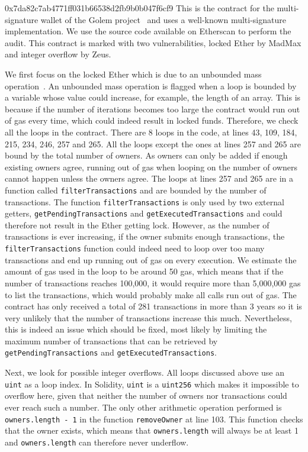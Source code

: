 \begin{investigation}{0x7da82c7ab4771ff031b66538d2fb9b0b047f6cf9}
  This is the contract for the multi-signature wallet of the Golem project~\cite{golem-project} and uses a well-known multi-signature implementation. We use the source code available on Etherscan to perform the audit.
  This contract is marked with two vulnerabilities, locked Ether by MadMax and integer overflow by Zeus.

  We first focus on the locked Ether which is due to an unbounded mass operation~\cite{Grech2018}.
  An unbounded mass operation is flagged when a loop is bounded by a variable whose value could increase, for example, the length of an array. This is because if the number of iterations becomes too large the contract would run out of gas every time, which could indeed result in locked funds. Therefore, we check all the loops in the contract. There are 8 loops in the code, at lines 43, 109, 184, 215, 234, 246, 257 and 265. All the loops except the ones at lines 257 and 265 are bound by the total number of owners. As owners can only be added if enough existing owners agree, running out of gas when looping on the number of owners cannot happen unless the owners agree. The loops at lines 257 and 265 are in a function called \lstinline{filterTransactions} and are bounded by the number of transactions. The function \lstinline{filterTransactions} is only used by two external getters, \lstinline{getPendingTransactions} and \lstinline{getExecutedTransactions} and could therefore not result in the Ether getting lock. However, as the number of transactions is ever increasing, if the owner submits enough transactions, the \lstinline{filterTransactions} function could indeed need to loop over too many transactions and end up running out of gas on every execution. We estimate the amount of gas used in the loop to be around 50 gas, which means that if the number of transactions reaches 100,000, it would require more than 5,000,000 gas to list the transactions, which would probably make all calls run out of gas. The contract has only received a total of 281 transactions in more than 3 years so it is very unlikely that the number of transactions increase this much. Nevertheless, this is indeed an issue which should be fixed, most likely by limiting the maximum number of transactions that can be retrieved by \lstinline{getPendingTransactions} and \lstinline{getExecutedTransactions}.

  Next, we look for possible integer overflows. All loops discussed above use an \lstinline{uint} as a loop index. In Solidity, \lstinline{uint} is a \lstinline{uint256} which makes it impossible to overflow here, given that neither the number of owners nor transactions could ever reach such a number. The only other arithmetic operation performed is \lstinline{owners.length - 1} in the function \lstinline{removeOwner} at line 103. This function checks that the owner exists, which means that \lstinline{owners.length} will always be at least 1 and \lstinline{owners.length} can therefore never underflow.
\end{investigation}

